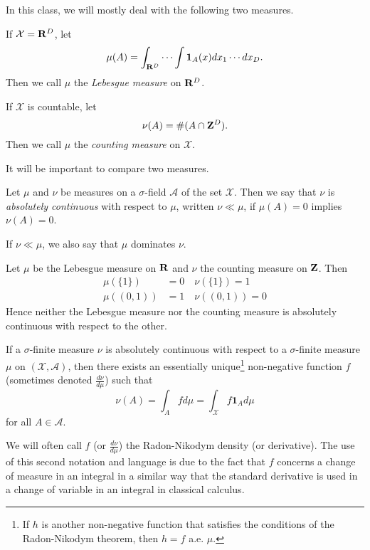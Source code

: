 \documentclass[twoside]{article}
\begin{document}
In this class, we will mostly deal with the following two measures.
\begin{example} 
 If $\mathcal X = \mathbf{R}^D$, let
    \[ \mu(A) = \int_{\mathbf{R}^D} \cdots \int \mathbf{1}_A(x) dx_1 \cdots dx_D. \]
  Then we call $\mu$ the \emph{Lebesgue measure} on $\mathbf{R}^D$.
\end{example}
\begin{example} 
  If $\mathcal X$ is countable, let
    \[ \nu(A) = \#(A \cap \mathbf{Z}^D). \]
  Then we call $\mu$ the \emph{counting measure} on $\mathcal X$.
\end{example}

It will be important to compare two measures.

\begin{definition}\label{def:absolutecontinuity}\citep[Def. 1.9, p.~7]{keener}
  Let $\mu$ and $\nu$ be measures on a $\sigma$-field $\mathcal A$ of the
  set $\mathcal X$. Then we say that $\nu$ is \emph{absolutely continuous} with
  respect to $\mu$, written $\nu \ll \mu$, if
  $\mu(A) = 0$ implies $\nu(A) = 0$.
\end{definition}
If $\nu \ll \mu$, we also say that $\mu$ dominates $\nu$.

\begin{example}  Let $\mu$ be the Lebesgue measure on $\mathbf{R}$ and $\nu$ the counting
  measure on $\mathbf{Z}$.  Then
  \begin{align*}
    \mu(\{1\}) &= 0 \quad \nu(\{1\}) = 1 \\
    \mu((0, 1)) &= 1 \quad \nu((0, 1)) = 0
  \end{align*}
  Hence neither the Lebesgue measure nor the counting measure is absolutely continuous
  with respect to the other.
\end{example}

\begin{theorem}\citep[Def. 1.10, p.~7]{keener}
  If a $\sigma$-finite measure $\nu$ is absolutely continuous with respect to a
  $\sigma$-finite measure $\mu$ on $(\mathcal X, \mathcal A)$, then there exists
  an essentially unique\footnote{If $h$ is
  another non-negative function that satisfies the conditions of the Radon-Nikodym theorem,
  then $h=f$ a.e. $\mu$.} non-negative function $f$
  (sometimes denoted $\frac{d\nu}{d\mu}$) such that
  \[\nu(A) = \int_A f d\mu = \int_{\mathcal X} f \mathbf{1}_A d\mu\]
  for all $A \in \mathcal A$.
\end{theorem}

We will often call $f$ (or $\frac{d\nu}{d\mu}$) the Radon-Nikodym density (or
derivative).  The use of this second notation and language is due to the fact that
$f$ concerns a change of measure in an integral in a similar way that the
standard derivative is used in a change of variable in an integral in classical
calculus. 
\end{document}
